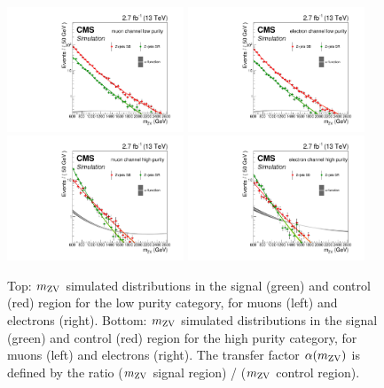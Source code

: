 \begin{figure}[htb]
\centering
\includegraphics[width=0.47\textwidth]{figures/fits/alphaMLP.pdf}
\includegraphics[width=0.47\textwidth]{figures/fits/alphaELP.pdf}\newline
\includegraphics[width=0.47\textwidth]{figures/fits/alphaMHP.pdf}
\includegraphics[width=0.47\textwidth]{figures/fits/alphaEHP.pdf}\newline
\caption[Alpha transfer factor]{
Top: $m_\mathrm{ZV}$ simulated distributions in the signal (green) and control (red) region for the low purity category,
for muons (left) and electrons (right). 
Bottom: $m_\mathrm{ZV}$ simulated distributions in the signal (green) and control (red) region for the high purity category,
for muons (left) and electrons (right). The transfer factor $\alpha(m_\mathrm{ZV})$ is defined by the ratio ($m_\mathrm{ZV}$ signal region) / ($m_\mathrm{ZV}$ control region).
}
\label{fig:alpha_MVZ}
\end{figure}

